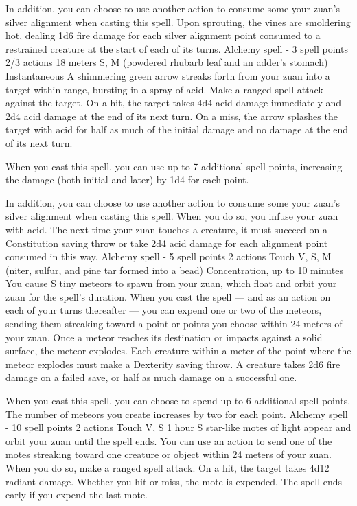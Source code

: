         In addition, you can choose to use another action to consume some your zuan's silver alignment when casting this spell.
        Upon sprouting, the vines are smoldering hot, dealing 1d6 fire damage for each silver alignment point consumed to a restrained creature at the start of each of its turns.
        {Alchemy spell - 3 spell points}
        {2/3 actions}
        {18 meters}
        {S, M (powdered rhubarb leaf and an adder's stomach)}
        {Instantaneous}
        A shimmering green arrow streaks forth from your zuan into a target within range, bursting in a spray of acid.
        Make a ranged spell attack against the target.
        On a hit, the target takes 4d4 acid damage immediately and 2d4 acid damage at the end of its next turn.
        On a miss, the arrow splashes the target with acid for half as much of the initial damage and no damage at the end of its next turn.

        When you cast this spell, you can use up to 7 additional spell points, increasing the damage (both initial and later) by 1d4 for each point.

        In addition, you can choose to use another action to consume some your zuan's silver alignment when casting this spell.
        When you do so, you infuse your zuan with acid.
        The next time your zuan touches a creature, it must succeed on a Constitution saving throw or take 2d4 acid damage for each alignment point consumed in this way.
        {Alchemy spell - 5 spell points}
        {2 actions}
        {Touch}
        {V, S, M (niter, sulfur, and pine tar formed into a bead)}
        {Concentration, up to 10 minutes}
        You cause S tiny meteors to spawn from your zuan, which float and orbit your zuan for the spell's duration.
        When you cast the spell --- and as an action on each of your turns thereafter --- you can expend one or two of the meteors, sending them streaking toward a point or points you choose within 24 meters of your zuan.
        Once a meteor reaches its destination or impacts against a solid surface, the meteor explodes.
        Each creature within a meter of the point where the meteor explodes must make a Dexterity saving throw.
        A creature takes 2d6 fire damage on a failed save, or half as much damage on a successful one.

        When you cast this spell, you can choose to spend up to 6 additional spell points.
        The number of meteors you create increases by two for each point.
        {Alchemy spell - 10 spell points}
        {2 actions}
        {Touch}
        {V, S}
        {1 hour}
        S star-like motes of light appear and orbit your zuan until the spell ends.
        You can use an action to send one of the motes streaking toward one creature or object within 24 meters of your zuan.
        When you do so, make a ranged spell attack.
        On a hit, the target takes 4d12 radiant damage.
        Whether you hit or miss, the mote is expended.
        The spell ends early if you expend the last mote.

